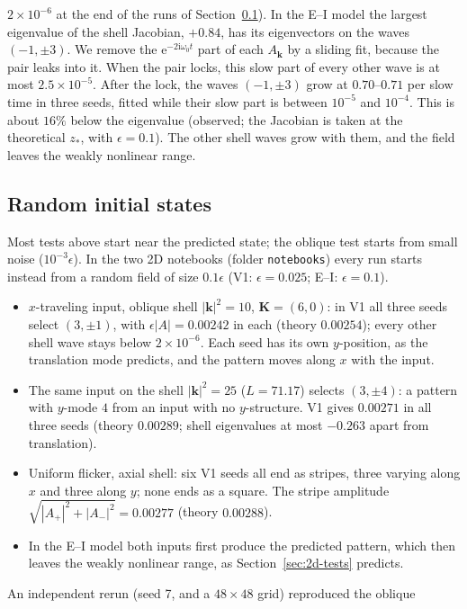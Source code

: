\documentclass[11pt]{article}
\newcommand{\ii}{\mathrm{i}}
\newcommand{\ee}{\mathrm{e}}
\begin{document}
$2\times10^{-6}$ at the end of the runs of Section~\ref{sec:2d-random}). In the
E--I model the largest eigenvalue of the shell Jacobian, $+0.84$, has its
eigenvectors on the waves $(-1,\pm3)$. We remove the $\ee^{-2\ii\omega_0t}$ part
of each $A_{\boldsymbol k}$ by a sliding fit, because the pair leaks into it.
When the pair locks, this slow part of every other wave is at most
$2.5\times10^{-5}$. After the lock, the waves $(-1,\pm3)$ grow at $0.70$--$0.71$
per slow time in three seeds, fitted while their slow part is between
$10^{-5}$ and $10^{-4}$. This is about $16\%$ below the eigenvalue (observed;
the Jacobian is taken at the theoretical $z_*$, with $\epsilon=0.1$). The other
shell waves grow with them, and the field leaves the weakly nonlinear range.

\subsection{Random initial states}
\label{sec:2d-random}
Most tests above start near the predicted state; the oblique test starts
from small noise ($10^{-3}\epsilon$). In the two 2D notebooks
(folder \texttt{notebooks}) every run starts instead from a random field of
size $0.1\epsilon$ (V1: $\epsilon=0.025$; E--I: $\epsilon=0.1$).
\begin{itemize}
 \item $x$-traveling input, oblique shell $|\boldsymbol k|^2=10$,
 $\boldsymbol K=(6,0)$: in V1 all three seeds select $(3,\pm1)$, with
 $\epsilon|A|=0.00242$ in each (theory $0.00254$); every other shell wave stays
 below $2\times10^{-6}$. Each seed has its own $y$-position, as the
 translation mode predicts, and the pattern moves along $x$ with the input.
 \item The same input on the shell $|\boldsymbol k|^2=25$ ($L=71.17$) selects
 $(3,\pm4)$: a pattern with $y$-mode $4$ from an input with no $y$-structure.
 V1 gives $0.00271$ in all three seeds (theory $0.00289$; shell eigenvalues at
 most $-0.263$ apart from translation).
 \item Uniform flicker, axial shell: six V1 seeds all end as stripes, three
 varying along $x$ and three along $y$; none ends as a square. The stripe
 amplitude $\sqrt{|A_+|^2+|A_-|^2}=0.00277$ (theory $0.00288$).
 \item In the E--I model both inputs first produce the predicted pattern, which
 then leaves the weakly nonlinear range, as Section~\ref{sec:2d-tests} predicts.
\end{itemize}
An independent rerun (seed 7, and a $48\times48$ grid) reproduced the oblique
\end{document}
